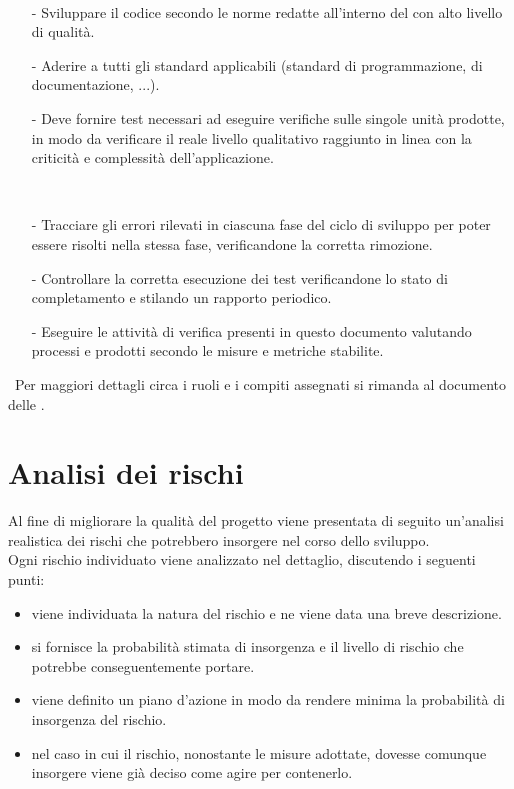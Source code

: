 \documentclass[a4paper, titlepage]{article}
\begin{document}
\begin{description}
\begin{itemize}
		\end{itemize}
		\ 
		\item {}
		\begin{itemize}
			\item[-] Sviluppare il codice secondo le norme redatte all'interno del  con alto livello di qualità.
			\item[-] Aderire a tutti gli standard applicabili (standard di programmazione, di documentazione, ...).
			\item[-] Deve fornire test necessari ad eseguire verifiche sulle singole unità prodotte, in modo da verificare il reale livello
			qualitativo raggiunto in linea con la criticità e complessità dell’applicazione.
		\end{itemize}
		\ 
		\item {}
		\begin{itemize}
			\item[-] Tracciare gli errori rilevati in ciascuna fase del ciclo di sviluppo per poter essere risolti nella stessa fase, verificandone la corretta rimozione.
			\item[-] Controllare la corretta esecuzione dei test verificandone lo stato di completamento e stilando un rapporto periodico. 
			\item[-] Eseguire le attività di verifica presenti in questo documento valutando processi e prodotti secondo le misure e metriche stabilite.
		\end{itemize}
		
	\end{description}
	\ 
	\newline Per maggiori dettagli circa i ruoli e i compiti assegnati si rimanda al documento delle .
	
	\newpage
	\section{Analisi dei rischi} \label{Analisi dei rischi}
	
	Al fine di migliorare la qualità del progetto viene presentata di seguito un'analisi realistica dei rischi che potrebbero insorgere nel corso dello sviluppo.\\
	Ogni rischio individuato viene analizzato nel dettaglio, discutendo i seguenti punti:
	
	\begin{itemize}
		\item \bold{Identificazione:} viene individuata la natura del rischio e ne viene data una breve descrizione.
		\item {} si fornisce la probabilità stimata di insorgenza e il livello di rischio che potrebbe conseguentemente portare.
		\item {} viene definito un piano d'azione in modo da rendere minima la probabilità di insorgenza del rischio. 
		\item \bold{Contenimento:} nel caso in cui il rischio, nonostante le misure adottate, dovesse comunque insorgere viene già deciso come agire per contenerlo.
	\end{itemize}
	
\end{document}
